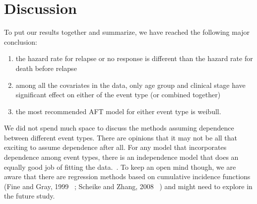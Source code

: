 \documentclass[times, doublespace]{simauth}
\begin{document}
\section{Discussion}
	To put our results together and summarize, we have reached the following major conclusion:
	\begin{enumerate}
		\item the hazard rate for relapse or no response is different than the hazard rate for death before relapse
		\item among all the covariates in the data, only age group and clinical stage have significant effect on either of the event type (or combined together)
		\item the most recommended AFT model for either event type is weibull.
	\end{enumerate}
	We did not spend much space to discuss the methods assuming dependence between different event types. There are opinions that it may not be all that exciting to assume dependence after all. For any model that incorporates dependence among event types, there is an independence model that does an equally good job of fitting the data.~\cite{Allison10}. To keep an open mind though, we are aware that there are regression methods based on cumulative incidence functions (Fine and Gray, 1999 ~\cite{Fine99}; Scheike and Zhang, 2008 ~\cite{Scheike08}) and might need to explore in the future study.
\end{document}
